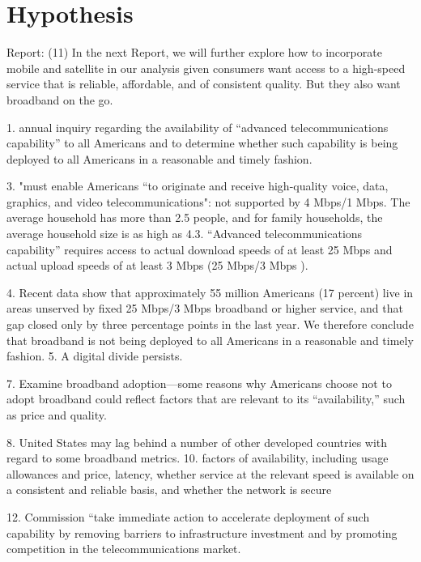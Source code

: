 \section{Hypothesis}
\label{hypothesis}

Report: (11) In the next Report, we will further explore how to incorporate mobile and satellite in our analysis given consumers want access to a high-speed service that is reliable, affordable, and of consistent quality. But they also want broadband on the go.

1. annual inquiry regarding the availability of “advanced telecommunications capability” to all Americans and to determine whether such capability is being deployed to all Americans in a reasonable and timely fashion.

3. "must enable Americans “to originate and receive high-quality voice, data, graphics, and video telecommunications": not supported by 4 Mbps/1 Mbps. The average household has more than 2.5 people, and for family households, the average household size is as high as 4.3. “Advanced telecommunications capability” requires access to actual download speeds of at least 25 Mbps and actual upload speeds of at least 3 Mbps (25 Mbps/3 Mbps ).

4. Recent data show that approximately 55 million Americans (17 percent) live in areas unserved by fixed 25 Mbps/3 Mbps broadband or higher service, and that gap closed only by three percentage points in the last year. We therefore conclude that broadband is not being deployed to all Americans in a reasonable and timely fashion. 5. A digital divide persists.

7. Examine broadband adoption—some reasons why Americans choose not to adopt broadband could reflect factors that are relevant to its “availability,” such as price and quality. 

8. United States may lag behind a number of other developed countries with regard to some broadband metrics. 10. factors of availability, including usage allowances and price, latency, whether service at the relevant speed is available on a consistent and reliable basis, and whether the network is secure

12. Commission “take immediate action to accelerate deployment of such capability by removing barriers to infrastructure investment and by promoting competition in the telecommunications market.


